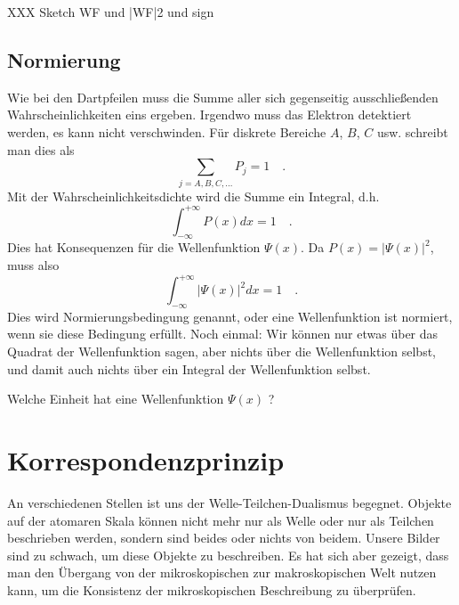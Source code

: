 \begin{marginfigure}
    \caption{XXX Sketch WF und |WF|2 und sign}
\end{marginfigure}



\subsection{Normierung}

Wie bei den Dartpfeilen muss die Summe aller sich gegenseitig ausschließenden Wahrscheinlichkeiten eins ergeben. Irgendwo muss das Elektron detektiert werden, es kann nicht verschwinden. Für diskrete Bereiche $A$, $B$, $C$ usw. schreibt man dies als
\begin{equation}
    \sum_{j = A, B, C, \dots} P_j = 1 \quad .
\end{equation}
Mit der Wahrscheinlichkeitsdichte wird die Summe ein Integral, d.h.
\begin{equation}
    \int_{-\infty}^{+\infty} P(x) dx = 1 \quad .
\end{equation}
Dies hat Konsequenzen für die Wellenfunktion $\Psi(x)$. Da $P(x) = |\Psi(x)|^2$, muss also 
\begin{equation}
    \int_{-\infty}^{+\infty} |\Psi(x)|^2 dx = 1 \quad .
\end{equation}
Dies wird Normierungsbedingung genannt, oder eine Wellenfunktion ist normiert, wenn sie diese Bedingung erfüllt. Noch einmal: Wir können nur etwas über das Quadrat der Wellenfunktion sagen, aber nichts über die Wellenfunktion selbst, und damit auch nichts über ein Integral der Wellenfunktion selbst.

\begin{questions}
    \item Welche Einheit hat eine Wellenfunktion $\Psi(x)$ ?
\end{questions}


\section{Korrespondenzprinzip}
An verschiedenen Stellen ist uns der Welle-Teilchen-Dualismus begegnet. Objekte auf der atomaren Skala können nicht mehr nur als Welle oder nur als Teilchen beschrieben werden, sondern sind beides oder nichts von beidem. Unsere Bilder sind zu schwach, um diese Objekte zu beschreiben. Es hat sich aber gezeigt, dass man den Übergang von der mikroskopischen zur makroskopischen Welt nutzen kann, um die Konsistenz der mikroskopischen Beschreibung zu überprüfen. 

